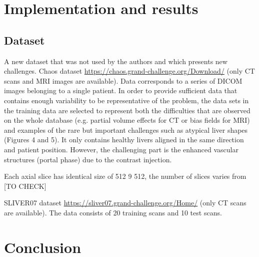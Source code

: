 \documentclass[a4paper, 11pt]{article}
\begin{document}
\section{Implementation and results}

\subsection{Dataset}
A new dataset that was not used by the authors and which presents new challenges. Chaos dataset \url{https://chaos.grand-challenge.org/Download/} (only CT scans and MRI images are available). Data corresponds to a series of DICOM images belonging to a single patient. In order to provide sufficient data that contains enough variability to be representative of the problem, the data sets in the training data are selected to represent both the difficulties that are observed on the whole database (e.g. partial volume effects for CT or bias fields for MRI) and examples of the rare but important challenges such as atypical liver shapes (Figures 4 and 5). It only contains healthy livers aligned in the same direction and patient position. However, the challenging part is the enhanced vascular structures (portal phase) due to the contrast injection. 

Each axial slice has identical size of 512 9 512, the number of slices varies from [TO CHECK]


SLIVER07 dataset \url{https://sliver07.grand-challenge.org/Home/} (only CT scans are available). The data consists of 20 training scans and 10 test scans.

\section{Conclusion}

\printbibliography
\end{document}
